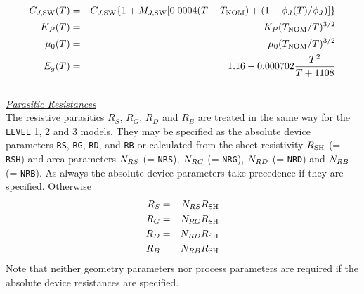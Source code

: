 \begin{eqnarray}
C_{J,\mbox{\scriptsize SW}} (T) & = & C_{J,\mbox{\scriptsize SW}} \{1 + M_{J,\mbox{\scriptsize SW}} [0.0004(T-T_{\mbox{\scriptsize NOM}})+(1-\phi_J (T)/\phi_J )]\} \\
K_P (T) & = & K_P  (T_{\mbox{\scriptsize NOM}}/T)^{3/2} \\
\mu_0 (T) & = & \mu_0  (T_{\mbox{\scriptsize NOM}}/T)^{3/2} \\
E_g(T) & = & 1.16 - 0.000702{{T^2} \over {T+1108}}\\
\end{eqnarray}\\[0.1in]
\noindent\underline{\sl \large Parasitic Resistances}\\[0.1in]
The resistive parasitics
$R_S$, $R_G$, $R_D$ and $R_B$ are treated in the same way for the {\tt
LEVEL} 1, 2 and 3 models.  They
may be specified as the absolute device parameters
{\tt RS}, {\tt RG}, {\tt RD}, and {\tt RB}
or calculated from the sheet resistivity $R_{\mbox{\scriptsize SH}}$ (= {\tt RSH})
and area parameters
$N_{RS}$ (= {\tt NRS}),
$N_{RG}$ (= {\tt NRG}),
$N_{RD}$ (= {\tt NRD}) and
$N_{RB}$ (= {\tt NRB}).
As always the absolute device parameters take precedence if they are specified.
Otherwise
\begin{eqnarray}
R_S & = & N_{RS}R_{\mbox{\scriptsize SH}}\\
R_G & = & N_{RG}R_{\mbox{\scriptsize SH}}\\
R_D & = & N_{RD}R_{\mbox{\scriptsize SH}}\\
R_B & = & N_{RB}R_{\mbox{\scriptsize SH}}
\end{eqnarray}
Note that neither geometry parameters nor process parameters are required
if the absolute device resistances are specified.

